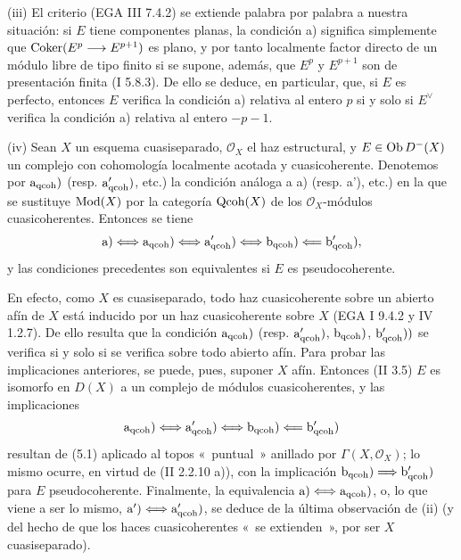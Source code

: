 (iii) El criterio (EGA III 7.4.2) se extiende palabra por palabra a nuestra situación: si \(E\) tiene componentes planas, la condición a) significa simplemente que \(\operatorname{Coker}(E^p\longrightarrow E^{p+1})\) es plano, y por tanto localmente factor directo de un módulo libre de tipo finito si se supone, además, que \(E^p\) y \(E^{p+1}\) son de presentación finita (I 5.8.3). De ello se deduce, en particular, que, si \(E\) es perfecto, entonces \(E\) verifica la condición a) relativa al entero \(p\) si y solo si \(E^{\vee}\) verifica la condición a) relativa al entero \(-p-1\).

(iv) Sean \(X\) un esquema cuasiseparado, \(\mathcal O_X\) el haz estructural, y \(E\in\operatorname{Ob} D^-(X)\) un complejo con cohomología localmente acotada y cuasicoherente. Denotemos por \(\mathrm a_{\mathrm{qcoh}})\) (resp. \(\mathrm a'_{\mathrm{qcoh}})\), etc.) la condición análoga a a) (resp. a'), etc.) en la que se sustituye \(\operatorname{Mod}(X)\) por la categoría \(\operatorname{Qcoh}(X)\) de los \(\mathcal O_X\)-módulos cuasicoherentes. Entonces se tiene
\[
 \mathrm a)\Longleftrightarrow\mathrm a_{\mathrm{qcoh}})\Longleftrightarrow\mathrm a'_{\mathrm{qcoh}})\Longleftrightarrow\mathrm b_{\mathrm{qcoh}})\Longleftarrow\mathrm b'_{\mathrm{qcoh}}),
\]
y las condiciones precedentes son equivalentes si \(E\) es pseudocoherente.

En efecto, como \(X\) es cuasiseparado, todo haz cuasicoherente sobre un abierto afín de \(X\) está inducido por un haz cuasicoherente sobre \(X\) (EGA I 9.4.2 y IV 1.2.7). De ello resulta que la condición \(\mathrm a_{\mathrm{qcoh}})\) (resp. \(\mathrm a'_{\mathrm{qcoh}})\), \(\mathrm b_{\mathrm{qcoh}})\), \(\mathrm b'_{\mathrm{qcoh}}))\) se verifica si y solo si se verifica sobre todo abierto afín. Para probar las implicaciones anteriores, se puede, pues, suponer \(X\) afín. Entonces (II 3.5) \(E\) es isomorfo en \(D(X)\) a un complejo de módulos cuasicoherentes, y las implicaciones
\[
 \mathrm a_{\mathrm{qcoh}})\Longleftrightarrow\mathrm a'_{\mathrm{qcoh}})\Longleftrightarrow\mathrm b_{\mathrm{qcoh}})\Longleftarrow\mathrm b'_{\mathrm{qcoh}})
\]
resultan de (5.1) aplicado al topos «~puntual~» anillado por \(\Gamma(X,\mathcal O_X)\); lo mismo ocurre, en virtud de (II 2.2.10 a)), con la implicación \(\mathrm b_{\mathrm{qcoh}})\Longrightarrow\mathrm b'_{\mathrm{qcoh}})\) para \(E\) pseudocoherente. Finalmente, la equivalencia \(\mathrm a)\Longleftrightarrow\mathrm a_{\mathrm{qcoh}})\), o, lo que viene a ser lo mismo, \(\mathrm a')\Longleftrightarrow\mathrm a'_{\mathrm{qcoh}})\), se deduce de la última observación de (ii) (y del hecho de que los haces cuasicoherentes «~se extienden~», por ser \(X\) cuasiseparado).

